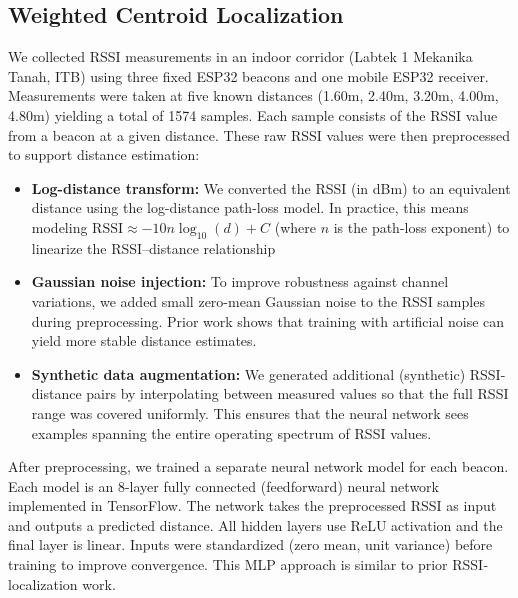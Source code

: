 \subsection{Weighted Centroid Localization}
We collected RSSI measurements in an indoor corridor (Labtek 1 Mekanika Tanah, ITB) using three fixed ESP32 beacons and one mobile ESP32 receiver. Measurements were taken at five known distances (1.60m, 2.40m, 3.20m, 4.00m, 4.80m) yielding a total of 1574 samples. Each sample consists of the RSSI value from a beacon at a given distance. These raw RSSI values were then preprocessed to support distance estimation: \begin{itemize}

\item {\bf Log-distance transform:} We converted the RSSI (in dBm) to an equivalent distance using the log-distance path-loss model. In practice, this means modeling $\text{RSSI}\approx -10n\log_{10}(d)+C$ (where $n$ is the path-loss exponent) to linearize the RSSI–distance relationship

\item {\bf Gaussian noise injection:} To improve robustness against channel variations, we added small zero-mean Gaussian noise to the RSSI samples during preprocessing. Prior work shows that training with artificial noise can yield more stable distance estimates.

\item {\bf Synthetic data augmentation:} We generated additional (synthetic) RSSI-distance pairs by interpolating between measured values so that the full RSSI range was covered uniformly. This ensures that the neural network sees examples spanning the entire operating spectrum of RSSI values.

\end{itemize} After preprocessing, we trained a separate neural network model for each beacon. Each model is an 8-layer fully connected (feedforward) neural network implemented in TensorFlow. The network takes the preprocessed RSSI as input and outputs a predicted distance. All hidden layers use ReLU activation and the final layer is linear. Inputs were standardized (zero mean, unit variance) before training to improve convergence. This MLP approach is similar to prior RSSI‐localization work.

